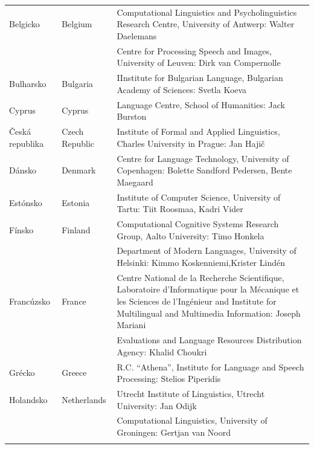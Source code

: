 \small
\begin{longtable}{@{}llp{113mm}@{}}
  Belgicko & \textcolor{grey1}{Belgium} & Computational Linguistics and Psycholinguistics Research Centre, University of Antwerp: Walter Daelemans\\ \addlinespace
  & & Centre for Processing Speech and Images, University of Leuven: Dirk van Compernolle \\ \addlinespace
  Bulharsko & \textcolor{grey1}{Bulgaria} & IInstitute for Bulgarian Language, Bulgarian Academy of Sciences: Svetla Koeva \\ \addlinespace
  Cyprus & \textcolor{grey1}{Cyprus} & Language Centre, School of Humanities: Jack Burston \\ \addlinespace
  Česká republika & \textcolor{grey1}{Czech Republic} & Institute of Formal and Applied Linguistics, Charles University in Prague: Jan Hajič \\ \addlinespace
  Dánsko &  \textcolor{grey1}{Denmark} & Centre for Language Technology, University of Copenhagen: \newline Bolette Sandford Pedersen, Bente Maegaard\\ \addlinespace
  Estónsko & \textcolor{grey1}{Estonia} & Institute of Computer Science, University of Tartu: Tiit Roosmaa, Kadri Vider\\ \addlinespace
  Fínsko & \textcolor{grey1}{Finland} & Computational Cognitive Systems Research Group, Aalto University: Timo Honkela\\ \addlinespace
  & & Department of Modern Languages, University of Helsinki: Kimmo Koskenniemi,\newline Krister Lindén \\ \addlinespace
  Francúzsko & \textcolor{grey1}{France} & Centre National de la Recherche Scientifique, Laboratoire d'Informatique pour la Mécanique et les Sciences de l'Ingénieur and Institute for Multilingual and Multimedia Information: Joseph Mariani \\ \addlinespace
  & & Evaluations and Language Resources Distribution Agency: Khalid Choukri\\ \addlinespace 
  Grécko & \textcolor{grey1}{Greece} & R.C. “Athena”, Institute for Language and Speech Processing: Stelios Piperidis\\ \addlinespace
  Holandsko & \textcolor{grey1}{Netherlands} & Utrecht Institute of Linguistics, Utrecht University: Jan Odijk\\ \addlinespace 
  & & Computational Linguistics, University of Groningen: Gertjan van Noord\\ \addlinespace

\end{longtable}
